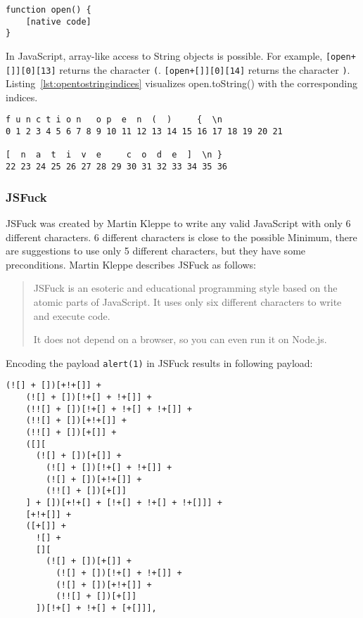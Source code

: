 \begin{lstlisting}[style=basicStyle, caption=open.toString() in JavaScript, label={lst:opentostring}]
function open() {
    [native code]
}
\end{lstlisting}

In JavaScript, array-like access to String objects is possible. \cite{js/stringbrackets} For example, \verb|[open+[]][0][13]| returns the character \verb|(|. \verb|[open+[]][0][14]| returns the character \verb|)|. Listing~\ref{lst:opentostringindices} visualizes open.toString() with the corresponding indices.

\begin{lstlisting}[style=basicStyle, caption=open.toString() with indices in JavaScript, label={lst:opentostringindices}]
f u n c t i o n   o p  e  n  (  )     {  \n
0 1 2 3 4 5 6 7 8 9 10 11 12 13 14 15 16 17 18 19 20 21

[  n  a  t  i  v  e     c  o  d  e  ]  \n }
22 23 24 25 26 27 28 29 30 31 32 33 34 35 36
\end{lstlisting}


\subsubsection{JSFuck}
\label{sec:jsfuck}
JSFuck was created by Martin Kleppe to write any valid JavaScript with only 6 different characters. 6 different characters is close to the possible Minimum, there are suggestions to use only 5 different characters, but they have some preconditions. \cite{mk/five, tc39/pipeline}
Martin Kleppe describes JSFuck as follows:
\begin{quote}
	JSFuck is an esoteric and educational programming style based on the atomic parts of JavaScript. It uses only six different characters to write and execute code.

	It does not depend on a browser, so you can even run it on Node.js. \cite{mk/jsfuck}
\end{quote}
Encoding the payload \verb|alert(1)| in JSFuck results in following payload:
\begin{lstlisting}[style=basicStyle, caption=alert(1) in JSFuck, label={lst:alert1jsfuck}]
  (![] + [])[+!+[]] +
    (![] + [])[!+[] + !+[]] +
    (!![] + [])[!+[] + !+[] + !+[]] +
    (!![] + [])[+!+[]] +
    (!![] + [])[+[]] +
    ([][
      (![] + [])[+[]] +
        (![] + [])[!+[] + !+[]] +
        (![] + [])[+!+[]] +
        (!![] + [])[+[]]
    ] + [])[+!+[] + [!+[] + !+[] + !+[]]] +
    [+!+[]] +
    ([+[]] +
      ![] +
      [][
        (![] + [])[+[]] +
          (![] + [])[!+[] + !+[]] +
          (![] + [])[+!+[]] +
          (!![] + [])[+[]]
      ])[!+[] + !+[] + [+[]]],
\end{lstlisting}

